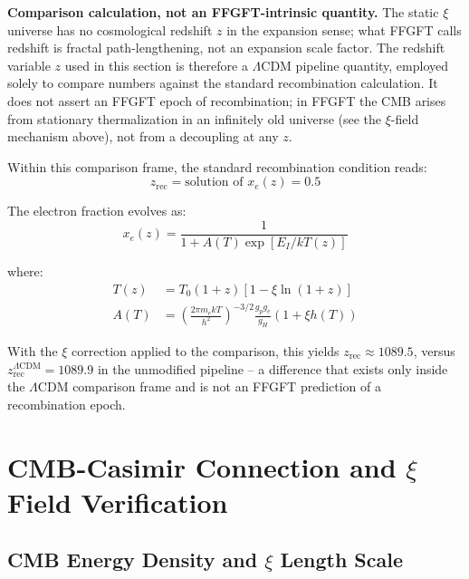 	\begin{important}
	\textbf{Comparison calculation, not an FFGFT-intrinsic quantity.} The static
	$\xi$ universe has no cosmological redshift $z$ in the expansion sense; what
	FFGFT calls redshift is fractal path-lengthening, not an expansion scale
	factor. The redshift variable $z$ used in this section is therefore a
	$\Lambda$CDM pipeline quantity, employed solely to compare numbers against
	the standard recombination calculation. It does not assert an FFGFT epoch of
	recombination; in FFGFT the CMB arises from stationary thermalization in an
	infinitely old universe (see the $\xi$-field mechanism above), not from a
	decoupling at any $z$.
	\end{important}

	Within this comparison frame, the standard recombination condition reads:
	\begin{equation}
		z_{\text{rec}} = \text{solution of } x_e(z) = 0.5
	\end{equation}

	The electron fraction evolves as:
	\begin{equation}
		x_e(z) = \frac{1}{1 + A(T) \exp[E_I/kT(z)]}
	\end{equation}

	where:
	\begin{align}
		T(z) &= T_0(1+z)[1 - \xi\ln(1+z)] \\
		A(T) &= \left(\frac{2\pi m_e kT}{h^2}\right)^{-3/2} 
		\frac{g_p g_e}{g_H} (1 + \xi h(T))
	\end{align}

	With the $\xi$ correction applied to the comparison, this yields
	$z_{\text{rec}} \approx 1089.5$, versus
	$z_{\text{rec}}^{\Lambda\text{CDM}} = 1089.9$ in the unmodified pipeline --
	a difference that exists only inside the $\Lambda$CDM comparison frame and is
	not an FFGFT prediction of a recombination epoch.

	
	\section{CMB-Casimir Connection and $\xi$ Field Verification}
	\label{sec:cmb_casimir}
	
	\subsection{CMB Energy Density and $\xi$ Length Scale}
	
